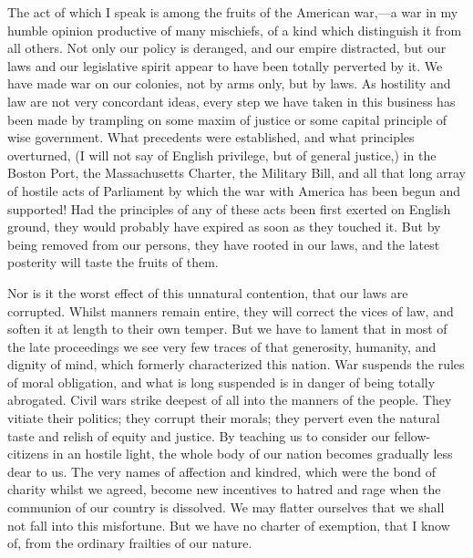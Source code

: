 The act of which I speak is among the fruits of the American war,—a war in my humble opinion productive of many mischiefs, of a kind which distinguish it from all others. Not only our policy is deranged, and our empire distracted, but our laws and our legislative spirit appear to have been totally perverted by it. We have made war on our colonies, not by arms only, but by laws. As hostility and law are not very concordant ideas, every step we have taken in this business has been made by trampling on some maxim of justice or some capital principle of wise government. What precedents were established, and what principles overturned, (I will not say of English privilege, but of general justice,) in the Boston Port, the Massachusetts Charter, the Military Bill, and all that long array of hostile acts of Parliament by which the war with America has been begun and supported! Had the principles of any of these acts been first exerted on English ground, they would probably have expired as soon as they touched it. But by being removed from our persons, they have rooted in our laws, and the latest posterity will taste the fruits of them.

Nor is it the worst effect of this unnatural contention, that our laws are corrupted. Whilst manners remain entire, they will correct the vices of law, and soften it at length to their own temper. But we have to lament that in most of the late proceedings we see very few traces of that generosity, humanity, and dignity of mind, which formerly characterized this nation. War suspends the rules of moral obligation, and what is long suspended is in danger of being totally abrogated. Civil wars strike deepest of all into the manners of the people. They vitiate their politics; they corrupt their morals; they pervert even the natural taste and relish of equity and justice. By teaching us to consider our fellow-citizens in an hostile light, the whole body of our nation becomes gradually less dear to us. The very names of affection and kindred, which were the bond of charity whilst we agreed, become new incentives to hatred and rage when the communion of our country is dissolved. We may flatter ourselves that we shall not fall into this misfortune. But we have no charter of exemption, that I know of, from the ordinary frailties of our nature.

